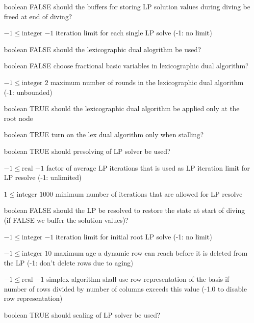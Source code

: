 %
{boolean}%
{FALSE}%
{should the buffers for storing LP solution values during diving be freed at end of diving?}%
{}

%
{$-1\leq\textrm{integer}$}%
{$-1$}%
{iteration limit for each single LP solve (-1: no limit)}%
{}

%
{boolean}%
{FALSE}%
{should the lexicographic dual alogrithm be used?}%
{}

%
{boolean}%
{FALSE}%
{choose fractional basic variables in lexicographic dual algorithm?}%
{}

%
{$-1\leq\textrm{integer}$}%
{$2$}%
{maximum number of rounds in the  lexicographic dual algorithm (-1: unbounded)}%
{}

%
{boolean}%
{TRUE}%
{should the lexicographic dual algorithm be applied only at the root node}%
{}

%
{boolean}%
{TRUE}%
{turn on the lex dual algorithm only when stalling?}%
{}

%
{boolean}%
{TRUE}%
{should presolving of LP solver be used?}%
{}

%
{$-1\leq\textrm{real}$}%
{$-1$}%
{factor of average LP iterations that is used as LP iteration limit for LP resolve (-1: unlimited)}%
{}

%
{$1\leq\textrm{integer}$}%
{$1000$}%
{minimum number of iterations that are allowed for LP resolve}%
{}

%
{boolean}%
{FALSE}%
{should the LP be resolved to restore the state at start of diving (if FALSE we buffer the solution values)?}%
{}

%
{$-1\leq\textrm{integer}$}%
{$-1$}%
{iteration limit for initial root LP solve (-1: no limit)}%
{}

%
{$-1\leq\textrm{integer}$}%
{$10$}%
{maximum age a dynamic row can reach before it is deleted from the LP (-1: don't delete rows due to aging)}%
{}

%
{$-1\leq\textrm{real}$}%
{$-1$}%
{simplex algorithm shall use row representation of the basis if number of rows divided by number of columns exceeds this value (-1.0 to disable row representation)}%
{}

%
{boolean}%
{TRUE}%
{should scaling of LP solver be used?}%
{}

